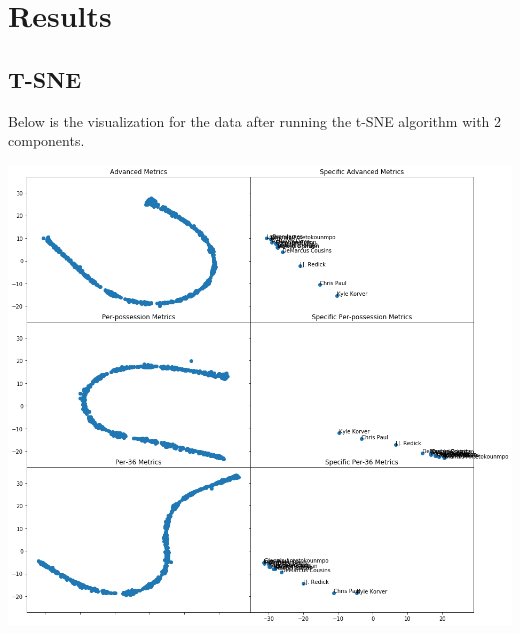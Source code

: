 \documentclass[12pt]{article}
\begin{document}
    \section{Results}
    \subsection{T-SNE}
    Below is the visualization for the data after running the t-SNE algorithm with 2 components.
    \begin{center}
        \includegraphics[scale=0.5]{images/only-tsne}
    \end{center}
\end{document}

